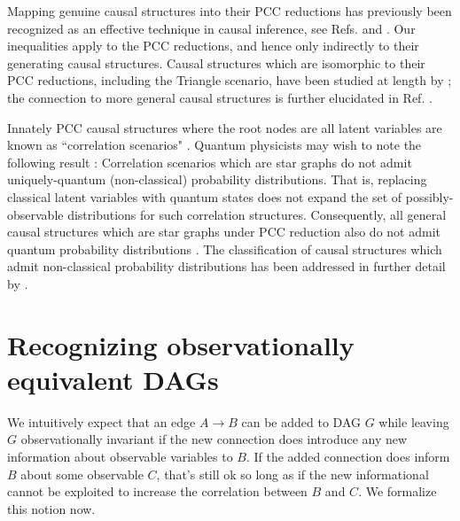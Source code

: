 Mapping genuine causal structures into their PCC reductions has previously been recognized as an effective technique in causal inference, see Refs. \citep[Thm. 2.4]{fritz2012bell} and \citep[Sec. 5]{BilocalCorrelations}. Our inequalities apply to the PCC reductions, and hence only indirectly to their generating causal structures. Causal structures which are isomorphic to their PCC reductions, including the Triangle scenario, have been studied at length by \citet{fritz2012bell}; the connection to more general causal structures is further elucidated in Ref. \cite{BeyondBellII}.

Innately PCC causal structures where the root nodes are all latent variables are known as ``correlation scenarios" \cite{fritz2012bell}. Quantum physicists may wish to note the following result \citep[Thm.~3.8]{fritz2012bell}: Correlation scenarios which are star graphs \citep[Fig.~6]{fritz2012bell} do not admit uniquely-quantum (non-classical) probability distributions. That is, replacing classical latent variables with quantum states does not expand the set of possibly-observable distributions for such correlation structures. Consequently, all general causal structures which are star graphs under PCC reduction also do not admit quantum probability distributions . The classification of causal structures which admit non-classical probability distributions has been addressed in further detail by \citet{pusey2014gdag}. 

\section{Recognizing observationally equivalent DAGs}



We intuitively expect that an edge $A\to B$ can be added to DAG $G$ while leaving $G$ observationally invariant if the new connection does introduce any new information about observable variables to $B$. If the added connection does inform $B$ about some observable $C$, that's still ok so long as if the new informational cannot be exploited to increase the correlation between $B$ and $C$. We formalize this notion now.

